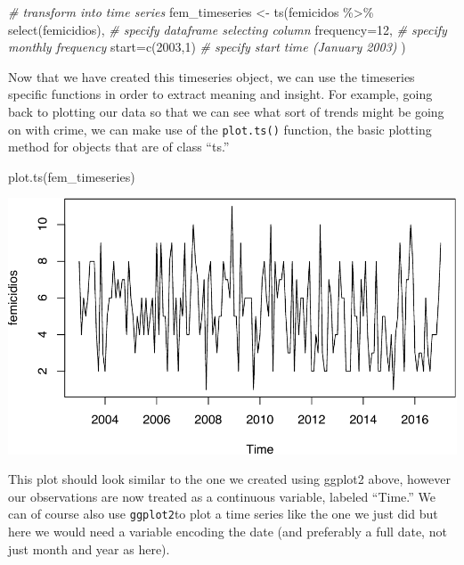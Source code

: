 \documentclass[
]{book}
\newenvironment{Shaded}{\begin{snugshade}}{\end{snugshade}}
\newcommand{\AttributeTok}[1]{\textcolor[rgb]{0.77,0.63,0.00}{#1}}
\newcommand{\CommentTok}[1]{\textcolor[rgb]{0.56,0.35,0.01}{\textit{#1}}}
\newcommand{\DecValTok}[1]{\textcolor[rgb]{0.00,0.00,0.81}{#1}}
\newcommand{\FunctionTok}[1]{\textcolor[rgb]{0.00,0.00,0.00}{#1}}
\newcommand{\NormalTok}[1]{#1}
\newcommand{\OtherTok}[1]{\textcolor[rgb]{0.56,0.35,0.01}{#1}}
\newcommand{\SpecialCharTok}[1]{\textcolor[rgb]{0.00,0.00,0.00}{#1}}
\begin{document}
\begin{Shaded}
\begin{Highlighting}[]
\CommentTok{\# transform into time series}
\NormalTok{fem\_timeseries }\OtherTok{\textless{}{-}} \FunctionTok{ts}\NormalTok{(femicidos }\SpecialCharTok{\%\textgreater{}\%} 
                       \FunctionTok{select}\NormalTok{(femicidios), }\CommentTok{\# specify dataframe selecting column}
                     \AttributeTok{frequency=}\DecValTok{12}\NormalTok{,  }\CommentTok{\# specify monthly frequency}
                     \AttributeTok{start=}\FunctionTok{c}\NormalTok{(}\DecValTok{2003}\NormalTok{,}\DecValTok{1}\NormalTok{) }\CommentTok{\# specify start time (January 2003)}
\NormalTok{                     )}
\end{Highlighting}
\end{Shaded}

Now that we have created this timeseries object, we can use the timeseries specific functions in order to extract meaning and insight. For example, going back to plotting our data so that we can see what sort of trends might be going on with crime, we can make use of the \texttt{plot.ts()} function, the basic plotting method for objects that are of class ``ts.''

\begin{Shaded}
\begin{Highlighting}[]
\FunctionTok{plot.ts}\NormalTok{(fem\_timeseries)}
\end{Highlighting}
\end{Shaded}

\includegraphics{crime_mapping_files/figure-latex/plot.ts_8a-1.pdf}

This plot should look similar to the one we created using ggplot2 above, however our observations are now treated as a continuous variable, labeled ``Time.'' We can of course also use \texttt{ggplot2}to plot a time series like the one we just did but here we would need a variable encoding the date (and preferably a full date, not just month and year as here).
\end{document}
